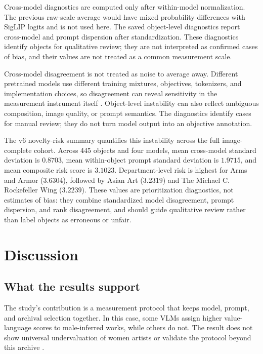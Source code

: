 \documentclass[pdflatex,sn-basic,Numbered]{sn-jnl}
\begin{document}
Cross-model diagnostics are computed only after within-model normalization. The previous raw-scale average would have mixed probability differences with SigLIP logits and is not used here. The saved object-level diagnostics report cross-model and prompt dispersion after standardization. These diagnostics identify objects for qualitative review; they are not interpreted as confirmed cases of bias, and their values are not treated as a common measurement scale.

Cross-model disagreement is not treated as noise to average away. Different pretrained models use different training mixtures, objectives, tokenizers, and implementation choices, so disagreement can reveal sensitivity in the measurement instrument itself \cite{radford2021learning, cherti2023reproducible, zhai2023sigmoid}. Object-level instability can also reflect ambiguous composition, image quality, or prompt semantics. The diagnostics identify cases for manual review; they do not turn model output into an objective annotation.

The v6 novelty-risk summary quantifies this instability across the full image-complete cohort. Across 445 objects and four models, mean cross-model standard deviation is $0.8703$, mean within-object prompt standard deviation is $1.9715$, and mean composite risk score is $3.1023$. Department-level risk is highest for Arms and Armor ($3.6304$), followed by Asian Art ($3.2319$) and The Michael C. Rockefeller Wing ($3.2239$). These values are prioritization diagnostics, not estimates of bias: they combine standardized model disagreement, prompt dispersion, and rank disagreement, and should guide qualitative review rather than label objects as erroneous or unfair.

\section{Discussion}
\label{sec:discussion}

\subsection{What the results support}

The study's contribution is a measurement protocol that keeps model, prompt, and archival selection together. In this case, some VLMs assign higher value-language scores to male-inferred works, while others do not. The result does not show universal undervaluation of women artists or validate the protocol beyond this archive \cite{wang2022revisiting, wolfe2022evidence, hall2023auditing}.
\end{document}

